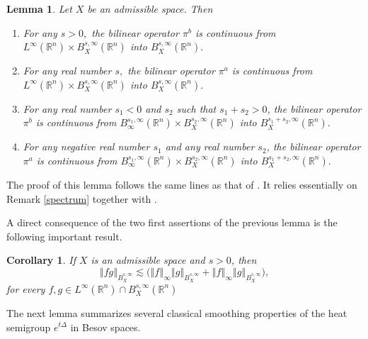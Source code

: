 \documentclass[11pt]{amsart}%
\theoremstyle{plain}
\numberwithin{equation}{section}
\newtheorem{corollary}{Corollary}[section]
\newtheorem{lemma}{Lemma}[section]
\begin{document}
\begin{lemma}\label{para}
Let $X$ be an admissible space. Then
\begin{enumerate}
\item For any $s>0,$ the bilinear operator $\pi ^{b}$ is continuous from $%
L^{\infty }(\mathbb{R}^{n})\times B_{X}^{s,\infty }(\mathbb{R}^{n})$
into $B_{X}^{s,\infty }(\mathbb{R}^{n}).$

\item For any real number $s,$ the bilinear operator $\pi ^{a}$ is continuous
from $L^{\infty }(\mathbb{R}^{n})\times B_{X}^{s,\infty }(\mathbb{R}^{n})
$ into $B_{X}^{s,\infty }(\mathbb{R}^{n}).$

\item For any real number $s_{1}<0$ and $s_{2}$ such that $%
s_{1}+s_{2}>0$, the bilinear operator $\pi ^{b}$ is continuous from $%
B_{\infty }^{s_{1},\infty }(\mathbb{R}^{n})\times B_{X}^{s_{2},\infty }(%
\mathbb{R}^{n})$ into $B_{X}^{s_{1}+s_{2},\infty }(\mathbb{R}^{n}).$

\item For any negative real number $s_{1}$ and any real number $s_{2}$, the
bilinear operator $\pi ^{a}$ is continuous from $B_{\infty }^{s_{1},\infty }(%
\mathbb{R}^{n})\times B_{X}^{s_{2},\infty }(\mathbb{R}^{n})$ into $%
B_{X}^{s_{1}+s_{2},\infty }(\mathbb{R}^{n}).$
\end{enumerate}
\end{lemma}
The proof of this lemma follows the same lines as that of \cite[Theorem 4.1]{Lem2}. It relies essentially on Remark \ref{spectrum} together with \cite[Lemma 4.2]{Lem2}.
\par A direct consequence of the two first assertions of the previous lemma is the following important result.
\begin{corollary}\label{banach}
If  $X$ is an admissible space and $s>0$, then
\[
\left\Vert fg\right\Vert_{B_{X}^{s,\infty }}\lesssim \big(\left\Vert f\right\Vert_\infty \left\Vert g\right\Vert_{B_{X}^{s,\infty }}+\left\Vert f\right\Vert_\infty \left\Vert g\right\Vert_{B_{X}^{s,\infty }}\big),
\]
for every $f,g\in L^\infty(\mathbb{R}^n)\cap B_{X}^{s,\infty }(\mathbb{R}^n)$
\end{corollary}
The next lemma summarizes several classical smoothing properties of the heat semigroup $e^{t\Delta}$ in Besov spaces.
\end{document}
